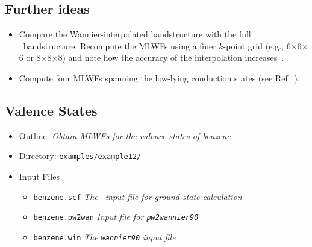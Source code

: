 \documentclass[a4paper,11pt,twoside]{article}
\begin{document}
\subsection*{Further ideas}

\begin{itemize}
\item Compare the Wannier-interpolated bandstructure with the full
  \pwscf\ bandstructure. Recompute the MLWFs using a finer $k$-point
  grid (e.g., 6$\times$6$\times$6 or 8$\times$8$\times$8) and note how
  the accuracy of the interpolation increases~\cite{yates-prb07}.
\item Compute four MLWFs spanning the low-lying conduction states (see
  Ref.~\cite{souza-prb01}).
\end{itemize}




\subsection*{Valence States}
\begin{itemize}
\item{Outline: \it{Obtain MLWFs for the valence states of benzene}}
\item{Directory: {\tt examples/example12/}}
\item{Input Files}
\begin{itemize}
\item{ {\tt benzene.scf}  {\it The \pwscf\ input file for ground state
    calculation}} 
\item{ {\tt benzene.pw2wan}  {\it Input file for {\tt pw2wannier90}}}
\item{ {\tt benzene.win}  {\it The {\tt wannier90} input file}}
\end{itemize}

\end{itemize}
\end{document}
